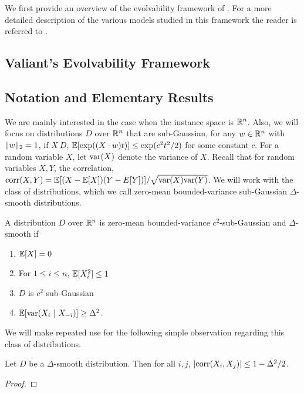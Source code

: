 We first provide an overview of the evolvability framework of
\citet{Valiant:2009}. For a more detailed description of the various models
studied in this framework the reader is referred to \cite{Kanade:2012}.

\subsection{Valiant's Evolvability Framework}

\subsection{Notation and Elementary Results}

We are mainly interested in the case when the instance space is $\mathbb{R}^n$.
Also, we will focus on distributions $D$ over $\mathbb{R}^n$ that are sub-Gaussian,
\ie for any $w \in \mathbb{R}^n$ with ${\Vert w \Vert_{2}} = 1$, if $X ~ D$, $\mathbb{E}[\exp((X
\cdot w) t)] \leq \exp(c^2t^2/2)$ for some constant $c$.  For a random variable
$X$, let $\mathrm{var}(X)$ denote the variance of $X$. Recall that for random variables
$X, Y$, the correlation, $\mathrm{corr}(X, Y) = \mathbb{E}[(X - \mathbb{E}[X]) (Y - E[Y])]/\sqrt{\mathrm{var}(X)
\mathrm{var}(Y)}$. We will work with the class of distributions, which we call zero-mean
bounded-variance sub-Gaussian $\Delta$-smooth distributions.


\begin{definition} A distribution $D$ over $\mathbb{R}^n$ is zero-mean
bounded-variance $c^2$-sub-Gaussian and $\Delta$-smooth if
\begin{enumerate}
\item $\mathbb{E}[X] = 0$
\item For $1 \leq i \leq n$, $\mathbb{E}[X_i^2] \leq 1$
\item $D$ is $c^2$ sub-Gaussian
\item $\mathbb{E}[\mathrm{var}(X_i ~|~ X_{-i})] \geq \Delta^2$.
\end{enumerate}
\end{definition}

We will make repeated use for the following simple observation regarding this
class of distributions.

\begin{lemma} Let $D$ be a $\Delta$-smooth distribution. Then for all $i, j$,
$|\mathrm{corr}(X_i, X_j)| \leq 1 - \Delta^2/2$.
\end{lemma}
\begin{proof}

\end{proof}

